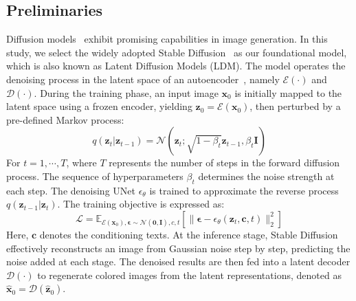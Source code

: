 \subsection{Preliminaries}
\label{subsec:preliminaries}

Diffusion models~\cite{ho2020ddpm} exhibit promising capabilities in image generation. In this study, we select the widely adopted Stable Diffusion~\cite{rombach2022ldm} as our foundational model, which is also known as Latent Diffusion Models (LDM). The model operates the denoising process in the latent space of an autoencoder~\cite{kingma2022ae}, namely $\mathcal{E}(\cdot)$ and $\mathcal{D}(\cdot)$. During the training phase, an input image $\bm{x}_{0}$ is initially mapped to the latent space using a frozen encoder, yielding $\bm{z}_{0}=\mathcal{E}(\bm{x}_{0})$, then perturbed by a pre-defined Markov process:
\begin{equation}
    q(\bm{z}_{t}|\bm{z}_{t-1})=\mathcal{N}(\bm{z}_{t}; \sqrt{1-\beta_{t}}\bm{z}_{t-1}, \beta_{t}\bm{I})
    \label{eq:img_diff}
\end{equation}
For $t=1,\cdots, T$, where $T$ represents the number of steps in the forward diffusion process. The sequence of hyperparameters $\beta_{t}$ determines the noise strength at each step. The denoising UNet $\epsilon_{\theta}$ is trained to approximate the reverse process $q(\bm{z}_{t-1}|\bm{z}_{t})$. The training objective is expressed as:
\begin{equation}
    \mathcal{L}=\mathbb{E}_{\mathcal{E}(\bm{x}_{0}),\bm{\epsilon}\sim\mathcal{N}(\bm{0}, \bm{I}), c, t}[\lVert \bm{\epsilon}-\epsilon_{\theta}(\bm{z}_{t},\bm{c},t) \rVert_{2}^{2}]
    \label{eq:img_diff_loss}
\end{equation}
Here, $\bm{c}$ denotes the conditioning texts. At the inference stage, Stable Diffusion effectively reconstructs an image from Gaussian noise step by step, predicting the noise added at each stage. The denoised results are then fed into a latent decoder $\mathcal{D}(\cdot)$ to regenerate colored images from the latent representations, denoted as $\hat{\bm{x}}_{0} = \mathcal{D}(\hat{\bm{z}}_{0})$.

